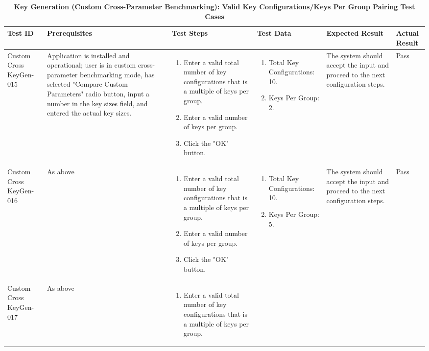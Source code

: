 \documentclass[]{final_report}
\theoremstyle{definition}
\begin{document}
\begin{longtable}{|p{1.5cm}|p{2.5cm}|p{3.5cm}|p{3cm}|p{3cm}|p{2cm}|}
  \caption{\textbf{Key Generation (Custom Cross-Parameter Benchmarking): Valid Key Configurations/Keys Per Group Pairing Test Cases}} \\
  \hline
  \textbf{Test ID} & \textbf{Prerequisites} & \textbf{Test Steps} & \textbf{Test Data} & \textbf{Expected Result} & \textbf{Actual Result} \\
  \hline
  Custom
  Cross
  KeyGen-015 & Application is installed and operational; user is in custom cross-parameter benchmarking mode, has selected "Compare Custom Parameters" radio button, input a number in the key sizes field, and entered the actual key sizes. & 
  \begin{enumerate}
    \item Enter a valid total number of key configurations that is a multiple of keys per group.
    \item Enter a valid number of keys per group.
    \item Click the "OK" button.
  \end{enumerate} &  \begin{enumerate}
    \item Total Key Configurations: 10.
    \item Keys Per Group: 2.
   \end{enumerate}  & The system should accept the input and proceed to the next configuration steps. & Pass \\
  \hline
  Custom
  Cross
  KeyGen-016 & As above & 
  \begin{enumerate}
    \item Enter a valid total number of key configurations that is a multiple of keys per group.
    \item Enter a valid number of keys per group.
    \item Click the "OK" button.
  \end{enumerate} &  \begin{enumerate}
    \item Total Key Configurations: 10.
    \item Keys Per Group: 5.
   \end{enumerate}  & The system should accept the input and proceed to the next configuration steps. & Pass \\
  \hline
  Custom
  Cross
  KeyGen-017 & As above & 
  \begin{enumerate}
    \item Enter a valid total number of key configurations that is a multiple of keys per group.

\end{enumerate}
\end{longtable}
\end{document}
